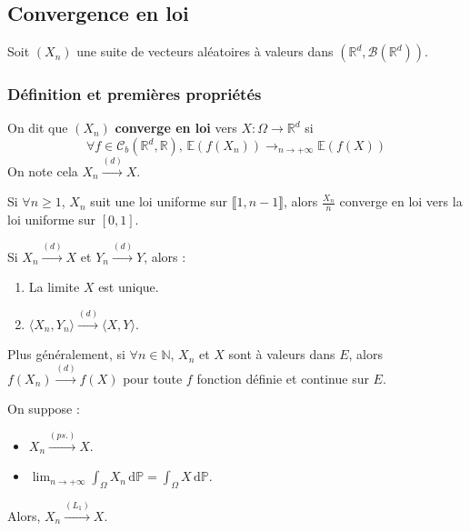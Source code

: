 	\subsection{Convergence en loi}

	Soit $(X_n)$ une suite de vecteurs aléatoires à valeurs dans $(\mathbb{R}^d, \mathcal{B}(\mathbb{R}^d))$.

	\subsubsection{Définition et premières propriétés}


	\begin{definition}
		On dit que $(X_n)$ \textbf{converge en loi} vers $X : \Omega \rightarrow \mathbb{R}^d$ si
		\[ \forall f \in \mathcal{C}_b(\mathbb{R}^d, \mathbb{R}), \, \mathbb{E}(f(X_n)) \longrightarrow_{n \rightarrow +\infty} \mathbb{E}(f(X)) \]
		On note cela $X_n \overset{(d)}{\longrightarrow} X$.
	\end{definition}


	\begin{example}
		Si $\forall n \geq 1$, $X_n$ suit une loi uniforme sur $\llbracket 1, n-1 \rrbracket$, alors $\frac{X_n}{n}$ converge en loi vers la loi uniforme sur $[0,1]$.
	\end{example}


	\begin{proposition}
		Si $X_n \overset{(d)}{\longrightarrow} X$ et $Y_n \overset{(d)}{\longrightarrow} Y$, alors :
		\begin{enumerate}[label=(\roman*)]
			\item La limite $X$ est unique.
			\item $\langle X_n, Y_n \rangle \overset{(d)}{\longrightarrow} \langle X, Y \rangle$.
		\end{enumerate}
		Plus généralement, si $\forall n \in \mathbb{N}$, $X_n$ et $X$ sont à valeurs dans $E$, alors $f(X_n) \overset{(d)}{\longrightarrow} f(X)$ pour toute $f$ fonction définie et continue sur $E$.
	\end{proposition}

	\begin{theorem}
		On suppose :
		\begin{itemize}
			\item $X_n \overset{(ps.)}{\longrightarrow} X$.
			\item $\lim_{n \rightarrow +\infty} \int_\Omega X_n \, \mathrm{d}\mathbb{P} = \int_\Omega X \, \mathrm{d}\mathbb{P}$.
		\end{itemize}
		Alors, $X_n \overset{(L_1)}{\longrightarrow} X$.
	\end{theorem}

